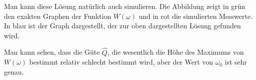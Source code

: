 \begin{diskussion}
Man kann diese Lösung natürlich auch simulieren.
Die Abbildung zeigt in {\color{darkgreen}grün} den exakten Graphen der
Funktion $W(\omega)$ und in {\color{red}rot} die simulierten Messwerte.
In {\color{blue}blau} ist der Graph dargestellt, der zur oben
dargestellten Lösung gefunden wird.
\begin{center}
\end{center}
Man kann sehen, dass die Güte $\hat{Q}$, die wesentlich die Höhe des
Maximums von $W(\omega)$ bestimmt relativ schlecht bestimmt wird, aber der
Wert von $\omega_0$ ist sehr genau.
\end{diskussion}

